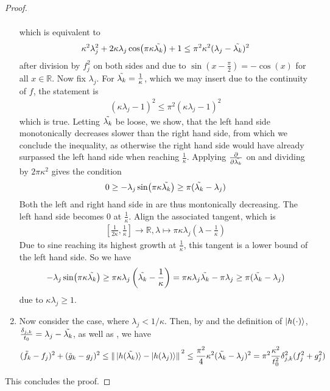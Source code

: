 \begin{proof}
\begin{enumerate}[label=\Roman*.]
\begin{align}
        \end{align}
        which is equivalent to
        \begin{align}
            \kappa^2\lambda_j^2+2\kappa\lambda_j\cos(\pi \kappa \tilde{\lambda_k})+1 \leq \pi^2\kappa^2(\lambda_j-\tilde{\lambda_k})^2 \label{special_lipschitz_3rd_case_second_equiv_condition}
        \end{align}
        after division by \(f_j^2\) on both sides and due to \(\sin\left(x-\frac{\pi}{2}\right) = -\cos(x)\) for all \(x \in \mathbb{R}\). Now fix \(\lambda_j\). For \(\tilde{\lambda_k} = \frac{1}{\kappa}\), which we may insert due to the continuity of \(f\), the statement is
        \begin{align}
            (\kappa\lambda_j-1)^2 \leq \pi^2 (\kappa\lambda_j-1)^2
        \end{align}
        which is true. Letting \(\tilde{\lambda_k}\) be loose, we show, that the left hand side monotonically decreases slower than the right hand side, from which we conclude the inequality, as otherwise the right hand side would have already surpassed the left hand side when reaching \(\frac{1}{\kappa}\). Applying \(\frac{\partial}{\partial \tilde{\lambda_k}}\) on  and dividing by \(2\pi\kappa^2\) gives the condition
        \begin{align}
            0 \geq -\lambda_j\sin(\pi \kappa \tilde{\lambda_k}) \geq \pi(\tilde{\lambda_k}-\lambda_j)
        \end{align}
        Both the left and right hand side in  are thus montonically decreasing. The left hand side becomes \(0\) at \(\frac{1}{\kappa}\). Align the associated tangent, which is
        \begin{align}
            \left[\frac{1}{2\kappa}, \frac{1}{\kappa}\right] \to \mathbb{R}, \lambda \mapsto \pi \kappa \lambda_j \left(\lambda - \frac{1}{\kappa}\right)
        \end{align}
        Due to sine reaching its highest growth at \(\frac{1}{\kappa}\), this tangent is a lower bound of the left hand side. So we have
        \begin{align}
            -\lambda_j\sin(\pi\kappa\tilde{\lambda_k}) \geq \pi \kappa \lambda_j \left(\tilde{\lambda_k} - \frac{1}{\kappa}\right) = \pi\kappa\lambda_j\tilde{\lambda_k} - \pi\lambda_j \geq \pi (\tilde{\lambda_k} - \lambda_j)
        \end{align}
        due to \(\kappa\lambda_j \geq 1\).
        \item Now consider the case, where \(\lambda_j < 1/\kappa\). Then, by  and the definition of \(\ket{h(\cdot)}\), \(\frac{\delta_{j, k}}{t_0} = \lambda_j - \tilde{\lambda_k}\), as well as , we have
        \begin{align}
            (\tilde{f}_k-f_j)^2 + (\tilde{g}_k-g_j)^2 \leq \norm*{\ket*{h(\tilde{\lambda_k})}-\ket{h(\lambda_j)}}^2 \leq \frac{\pi^2}{4}\kappa^2(\tilde{\lambda_k}-\lambda_j)^2 = \pi^2\frac{\kappa^2}{t_0^2}\delta_{j, k}^2(f_j^2+g_j^2)
        \end{align}
    \end{enumerate}

    This concludes the proof.
\end{proof}

